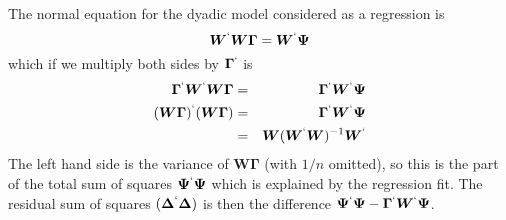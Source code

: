 \documentclass[titlepage,a4paper,12pt]{article}  %
\begin{document}
The normal equation for the dyadic model considered as a regression is
\begin{displaymath}
\bm{W}^{`} \bm{W} \bm{\Gamma} = \bm{W}^{`} \bm{\Psi}
\end{displaymath}
which if we multiply both sides by $\bm{\Gamma}^{`}$ is
\begin{eqnarray*}
\bm{\Gamma}^{`} \bm{W}^{`} \bm{W} \bm{\Gamma} & = & \bm{\Gamma}^{`} \bm{W}^{`} \bm{\Psi} \\
(\bm{W}\bm{\Gamma})^{`} (\bm{W}\bm{\Gamma}) & = & \bm{\Gamma}^{`} \bm{W}^{`} \bm{\Psi} \\
 & = & \bm{W}(\bm{W}^{`}\bm{W})^{-1}\bm{W}^{`}
\end{eqnarray*}
The left hand side is the variance of $\bm{W}\bm{\Gamma}$ (with $1/n$ omitted), so this is the part of the total sum of squares $\bm{\Psi}^{`}\bm{\Psi}$ which is explained by the regression fit. The residual sum of squares $(\bm{\Delta}^{`} \bm{\Delta})$ is then the difference $\bm{\Psi}^{`}\bm{\Psi} - \bm{\Gamma}^{`} \bm{W}^{`} \bm{\Psi}$.
\end{document}
